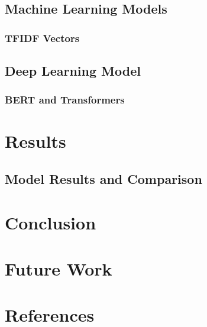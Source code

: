 \documentclass[12pt]{article}
\begin{document}
	\subsection{Machine Learning Models}
		\subsubsection{TFIDF Vectors}
	
	\subsection{Deep Learning Model}
		\subsubsection{BERT and Transformers}

\section{Results}
	\subsection{Model Results and Comparison}

\section{Conclusion}

\section{Future Work}

\section{References}
\end{document}
